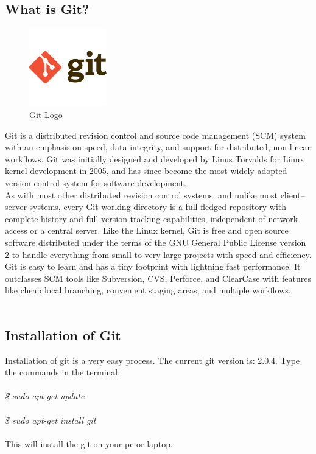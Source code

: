 \subsection{What is Git?}
\begin{figure}[!ht]
\centering
\includegraphics[width=0.3\textwidth]{images/git}                   
\caption{Git Logo}
\hspace{-1.5em}
\end{figure}
Git is a distributed revision control and source code management (SCM) system with an emphasis on speed, data integrity, and support for distributed, non-linear workflows. Git was initially designed and developed by Linus Torvalds for Linux kernel development in 2005, and has since become the most widely adopted version control system for software development.\\

As with most other distributed revision control systems, and unlike most client–server systems, every Git working directory is a full-fledged repository with complete history and full version-tracking capabilities, independent of network access or a central server. Like the Linux kernel, Git is free and open source software distributed under the terms of the GNU General Public License version 2 to handle everything from small to very large projects with speed and efficiency.\\

Git is easy to learn and has a tiny footprint with lightning fast performance. It outclasses SCM tools like Subversion, CVS, Perforce, and ClearCase with features like cheap local branching, convenient staging areas, and multiple workflows.\\\\

\subsection{Installation of Git}

Installation of git is a very easy process.
The current git version is: 2.0.4.
Type the commands in the terminal:\\\\
\emph{
\$ sudo apt-get update\\\\
\$ sudo apt-get install git\\\\}
This will install the git on your pc or laptop.

